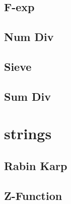 \subsection{F-exp}
\raggedbottom
\hrulefill
\subsection{Num Div}
\raggedbottom
\hrulefill
\subsection{Sieve}
\raggedbottom
\hrulefill
\subsection{Sum Div}
\raggedbottom
\hrulefill

\section{strings}
\subsection{Rabin Karp}
\raggedbottom
\hrulefill
\subsection{Z-Function}
\raggedbottom
\hrulefill

